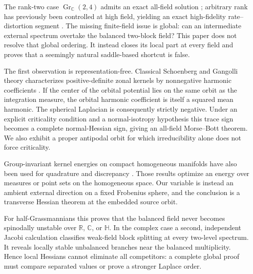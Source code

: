 \documentclass[11pt]{article}
\newcommand{\R}{\mathbb R}
\newcommand{\C}{\mathbb C}
\newcommand{\Hh}{\mathbb H}
\newcommand{\Gr}{\operatorname{Gr}}
\begin{document}
The rank-two case $\Gr_{\C}(2,4)$ admits an exact all-field solution
\cite{ErikssonRankTwo2026}; arbitrary rank has previously been controlled at
high field, yielding an exact high-fidelity rate--distortion segment
\cite{ErikssonHighFidelity2026}.  The missing finite-field issue is global:
can an intermediate external spectrum overtake the balanced two-block field?
This paper does not resolve that global ordering.  It instead closes its
local part at every field and proves that a seemingly natural saddle-based
shortcut is false.

The first observation is representation-free.  Classical Schoenberg and
Gangolli theory characterizes positive-definite zonal kernels by nonnegative
harmonic coefficients \cite{Schoenberg1942,Gangolli1967}.  If the center of
the orbital potential lies on the same orbit as the integration measure, the
orbital harmonic coefficient is itself a squared mean harmonic.  The
spherical Laplacian is consequently strictly negative.  Under an explicit
criticality condition and a normal-isotropy hypothesis this trace sign becomes
a complete normal-Hessian sign, giving an all-field Morse--Bott theorem.  We
also exhibit a proper antipodal orbit for which irreducibility alone does not
force criticality.

Group-invariant kernel energies on compact homogeneous manifolds have also
been used for quadrature and discrepancy \cite{DamelinEtAl2009}.  Those
results optimize an energy over measures or point sets on the homogeneous
space.  Our variable is instead an ambient external direction on a fixed
Frobenius sphere, and the conclusion is a transverse Hessian theorem at the
embedded source orbit.

For half-Grassmannians this proves that the balanced field never becomes
spinodally unstable over $\R$, $\C$, or $\Hh$.  In the complex case a second,
independent Jacobi calculation classifies weak-field block splitting at every
two-level spectrum.  It reveals locally stable unbalanced branches near the
balanced multiplicity.  Hence local Hessians cannot eliminate all
competitors: a complete global proof must compare separated values or prove
a stronger Laplace order.
\end{document}
